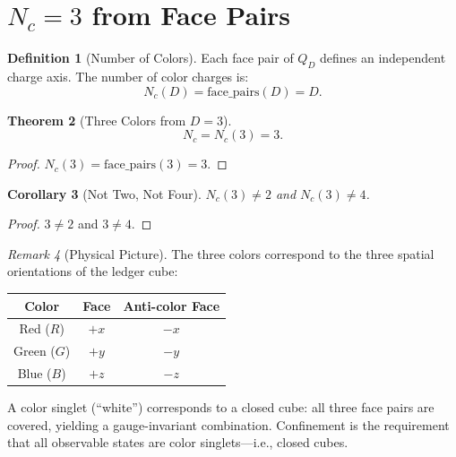 \documentclass[12pt,a4paper]{article}
\newtheorem{theorem}{Theorem}[section]
\newtheorem{corollary}[theorem]{Corollary}
\theoremstyle{definition}
\newtheorem{definition}[theorem]{Definition}
\theoremstyle{remark}
\newtheorem{remark}[theorem]{Remark}
\begin{document}
\section{$N_c = 3$ from Face Pairs}
\label{sec:colors}

\begin{definition}[Number of Colors]
\label{def:Nc}
Each face pair of $Q_D$ defines an independent charge axis.  The
number of color charges is:
\begin{equation}
  N_c(D) = \mathrm{face\_pairs}(D) = D.
\end{equation}
\end{definition}

\begin{theorem}[Three Colors from $D = 3$]
\label{thm:3colors}
\begin{equation}
  \boxed{N_c = N_c(3) = 3.}
\end{equation}
\end{theorem}

\begin{proof}
$N_c(3) = \mathrm{face\_pairs}(3) = 3$.
\end{proof}

\begin{corollary}[Not Two, Not Four]
\label{cor:unique}
$N_c(3) \neq 2$ and $N_c(3) \neq 4$.
\end{corollary}

\begin{proof}
$3 \neq 2$ and $3 \neq 4$.
\end{proof}

\begin{remark}[Physical Picture]
The three colors correspond to the three spatial orientations of the
ledger cube:
\begin{center}
\begin{tabular}{@{}ccc@{}}
\toprule
\textbf{Color} & \textbf{Face} & \textbf{Anti-color Face} \\
\midrule
Red ($R$) & $+x$ & $-x$ \\
Green ($G$) & $+y$ & $-y$ \\
Blue ($B$) & $+z$ & $-z$ \\
\bottomrule
\end{tabular}
\end{center}
A color singlet (``white'') corresponds to a closed cube: all three
face pairs are covered, yielding a gauge-invariant combination.
Confinement is the requirement that all observable states are color
singlets---i.e., closed cubes.
\end{remark}
\end{document}
